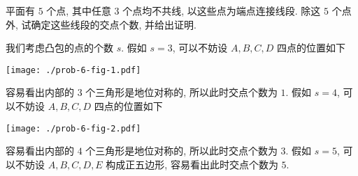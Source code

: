 \begin{prob}
\label{prob:prob-6}
平面有 $5$ 个点, 其中任意 $3$ 个点均不共线,
以这些点为端点连接线段. 除这 $5$ 个点外,
试确定这些线段的交点个数, 并给出证明.
\end{prob}

\begin{soln}
我们考虑凸包的点的个数 $s$.
假如 $s = 3$, 可以不妨设 $A, B, C, D$ 四点的位置如下

\begin{center}
\texttt{[image: ./prob-6-fig-1.pdf]}
\end{center}

容易看出内部的 $3$ 个三角形是地位对称的,
所以此时交点个数为 $\boxed{1}$.
假如 $s = 4$, 可以不妨设 $A, B, C, D$ 四点的位置如下

\begin{center}
\texttt{[image: ./prob-6-fig-2.pdf]}
\end{center}

容易看出内部的 $4$ 个三角形是地位对称的,
所以此时交点个数为 $\boxed{3}$.
假如 $s = 5$, 可以不妨设 $A, B, C, D, E$ 构成正五边形,
容易看出此时交点个数为 $\boxed{5}$.
\end{soln}
